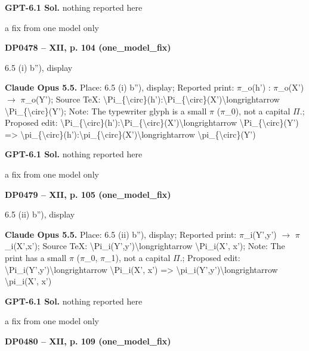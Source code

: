 \textbf{GPT-6.1 Sol.} nothing reported here\par
a fix from one model only\par
\par\noindent\hypertarget{DP0478}{}\textbf{DP0478 -- XII, p. 104 (one\_model\_fix)}\par
6.5 (i) b''), display\par
\textbf{Claude Opus 5.5.} Place: 6.5 (i) b''), display; Reported print: \ensuremath{\pi}\_o(h') : \ensuremath{\pi}\_o(X') \ensuremath{\to} \ensuremath{\pi}\_o(Y'); Source TeX: \textbackslash{}Pi\_\{\textbackslash{}circ\}(h'):\textbackslash{}Pi\_\{\textbackslash{}circ\}(X')\textbackslash{}longrightarrow \textbackslash{}Pi\_\{\textbackslash{}circ\}(Y'); Note: The typewriter glyph is a small \ensuremath{\pi} (\ensuremath{\pi}\_0), not a capital \ensuremath{\Pi}.; Proposed edit: \textbackslash{}Pi\_\{\textbackslash{}circ\}(h'):\textbackslash{}Pi\_\{\textbackslash{}circ\}(X')\textbackslash{}longrightarrow \textbackslash{}Pi\_\{\textbackslash{}circ\}(Y') =\allowbreak > \textbackslash{}pi\_\{\textbackslash{}circ\}(h'):\textbackslash{}pi\_\{\textbackslash{}circ\}(X')\textbackslash{}longrightarrow \textbackslash{}pi\_\{\textbackslash{}circ\}(Y')\par
\textbf{GPT-6.1 Sol.} nothing reported here\par
a fix from one model only\par
\par\noindent\hypertarget{DP0479}{}\textbf{DP0479 -- XII, p. 105 (one\_model\_fix)}\par
6.5 (ii) b''), display\par
\textbf{Claude Opus 5.5.} Place: 6.5 (ii) b''), display; Reported print: \ensuremath{\pi}\_i(Y',y') \ensuremath{\to} \ensuremath{\pi}\_i(X',x'); Source TeX: \textbackslash{}Pi\_i(Y',y')\textbackslash{}longrightarrow \textbackslash{}Pi\_i(X', x'); Note: The print has a small \ensuremath{\pi} (\ensuremath{\pi}\_0, \ensuremath{\pi}\_1), not a capital \ensuremath{\Pi}.; Proposed edit: \textbackslash{}Pi\_i(Y',y')\textbackslash{}longrightarrow \textbackslash{}Pi\_i(X', x') =\allowbreak > \textbackslash{}pi\_i(Y',y')\textbackslash{}longrightarrow \textbackslash{}pi\_i(X', x')\par
\textbf{GPT-6.1 Sol.} nothing reported here\par
a fix from one model only\par
\par\noindent\hypertarget{DP0480}{}\textbf{DP0480 -- XII, p. 109 (one\_model\_fix)}\par
